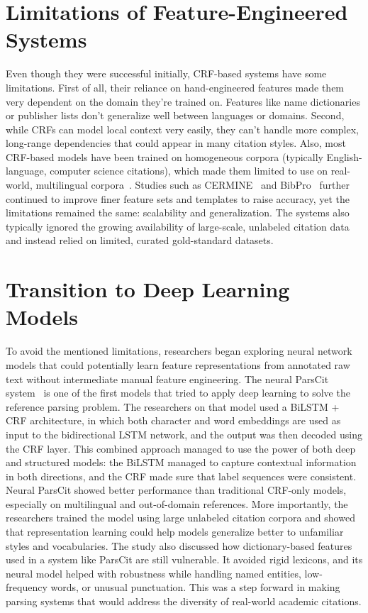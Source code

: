\section{Limitations of Feature-Engineered Systems}
Even though they were successful initially, CRF-based systems have some limitations. First of all, their reliance on hand-engineered features made them very dependent on the domain they’re trained on. Features like name dictionaries or publisher lists don’t generalize well between languages or domains. Second, while CRFs can model local context very easily, they can’t handle more complex, long-range dependencies that could appear in many citation styles. Also, most CRF-based models have been trained on homogeneous corpora (typically English-language, computer science citations), which made them limited to use on real-world, multilingual corpora~\cite{prasad2018neuralparscit}.
Studies such as CERMINE~\cite{cermine} and BibPro~\cite{bibpro} further continued to improve finer feature sets and templates to raise accuracy, yet the limitations remained the same: scalability and generalization. The systems also typically ignored the growing availability of large-scale, unlabeled citation data and instead relied on limited, curated gold-standard datasets.

\section{Transition to Deep Learning Models}
To avoid the mentioned limitations, researchers began exploring neural network models that could potentially learn feature representations from annotated raw text without intermediate manual feature engineering. The neural ParsCit system~\cite{prasad2018neuralparscit} is one of the first models that tried to apply deep learning to solve the reference parsing problem. The researchers on that model used a BiLSTM + CRF architecture, in which both character and word embeddings are used as input to the bidirectional LSTM network, and the output was then decoded using the CRF layer.
This combined approach managed to use the power of both deep and structured models: the BiLSTM managed to capture contextual information in both directions, and the CRF made sure that label sequences were consistent. Neural ParsCit showed better performance than traditional CRF-only models, especially on multilingual and out-of-domain references. More importantly, the researchers trained the model using large unlabeled citation corpora and showed that representation learning could help models generalize better to unfamiliar styles and vocabularies.
The study also discussed how dictionary-based features used in a system like ParsCit are still vulnerable. It avoided rigid lexicons, and its neural model helped with robustness while handling named entities, low-frequency words, or unusual punctuation. This was a step forward in making parsing systems that would address the diversity of real-world academic citations.

